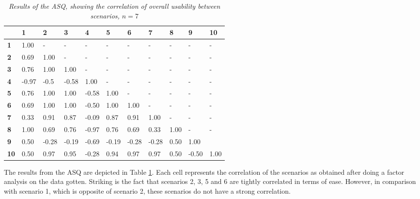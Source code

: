 \documentclass[11pt,a4paper]{article}
\begin{document}
\begin{table}[h]
\begin{center}
\begin{tabular}{l | llllllllll}
            & \textbf{1} & \textbf{2} & \textbf{3} & \textbf{4} & \textbf{5} & \textbf{6} & \textbf{7} & \textbf{8} & \textbf{9} & \textbf{10} \\
\hline
\textbf{1}  & 1.00       & -          & -          & -          & -          & -          & -          & -          & -          & -           \\
\textbf{2}  & 0.69        & 1.00       & -          & -          & -          & -          & -          & -          & -          & -           \\
\textbf{3}  & 0.76       & 1.00       & 1.00       & -          & -          & -          & -          & -          & -          & -           \\
\textbf{4}  & -0.97      & -0.5       & -0.58      & 1.00       & -          & -          & -          & -          & -          & -           \\
\textbf{5}  & 0.76       & 1.00       & 1.00       & -0.58      & 1.00       & -          & -          & -          & -          & -           \\
\textbf{6}  & 0.69       & 1.00       & 1.00       & -0.50      & 1.00       & 1.00       & -          & -          & -          & -           \\
\textbf{7}  & 0.33       & 0.91       & 0.87       & -0.09      & 0.87       & 0.91       & 1.00       & -          & -          & -           \\
\textbf{8}  & 1.00       & 0.69       & 0.76       & -0.97      & 0.76       & 0.69       & 0.33       & 1.00       & -          & -           \\
\textbf{9}  & 0.50       & -0.28      & -0.19      & -0.69      & -0.19      & -0.28      & -0.28      & 0.50       & 1.00       &             \\
\textbf{10} & 0.50       & 0.97       & 0.95       & -0.28      & 0.94       & 0.97       & 0.97       & 0.50       & -0.50      & 1.00       
\end{tabular}
\caption{\textit{Results of the ASQ, showing the correlation of overall usability between scenarios, $n=7$}}
\label{tab:ASQ}
\end{center}
\end{table}

The results from the ASQ are depicted in Table \ref{tab:ASQ}. Each cell represents the correlation of the scenarios as obtained after doing a factor analysis on the data gotten. Striking is the fact that scenarios 2, 3, 5 and 6 are tightly correlated in terms of ease. However, in comparison with scenario 1, which is opposite of scenario 2, these scenarios do not have a strong correlation.\\
\end{document}
